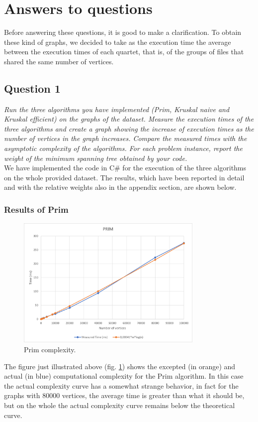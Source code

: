 \section{Answers to questions}

Before answering these questions, it is good to make a clarification. To obtain these kind of graphs, 
we decided to take as the execution time the average between the execution times of each quartet, that is, 
of the groups of files that shared the same number of vertices.

\subsection{Question 1}
\textit{Run the three algorithms you have implemented (Prim, Kruskal naive and Kruskal efficient) on the 
graphs of the dataset. Measure the execution times of the three algorithms and create a graph showing the 
increase of execution times as the number of vertices in the graph increases. Compare the measured times 
with the asymptotic complexity of the algorithms. For each problem instance, report the weight of the minimum 
spanning tree obtained by your code.} \\

\noindent
We have implemented the code in C\# for the execution of the three algorithms on the whole provided dataset. 
The results, which have been reported in detail and with the relative weights also in the appendix section, 
are shown below.

\subsubsection{Results of Prim}
\begin{figure}[H]
    \centering
    \includegraphics[width=0.8\textwidth]{../img/Prim.png}
    \caption{Prim complexity.}
    \label{fig:prim}
\end{figure}
The figure just illustrated above (fig. \ref{fig:prim}) shows the excepted (in orange) and actual (in blue) 
computational complexity for the Prim algorithm. In this case the actual complexity 
curve has a somewhat strange behavior, in fact for the graphs with 80000 vertices, the average time is greater than 
what it should be, but on the whole the actual complexity curve remains below the theoretical curve.

